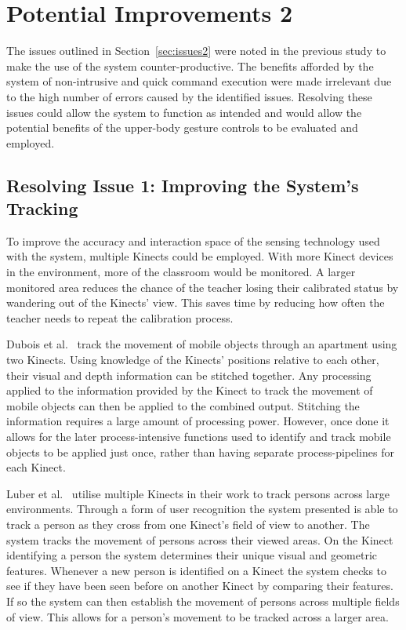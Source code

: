 \documentclass[manuscript, review, screen]{acmart}
\begin{document}
\section{Potential Improvements 2}  
\label{sec:improvements2}

The issues outlined in Section~\ref{sec:issues2} were noted in the previous study to make the use of the system counter-productive.
The benefits afforded by the system of non-intrusive and quick command execution were made irrelevant due to the high number of errors caused by the identified issues.
Resolving these issues could allow the system to function as intended and would allow the potential benefits of the upper-body gesture controls to be evaluated and employed.

\subsection{Resolving Issue 1: Improving the System's Tracking}
\label{sec:improve_accuracy}

To improve the accuracy and interaction space of the sensing technology used with the system, multiple Kinects could be employed.
With more Kinect devices in the environment, more of the classroom would be monitored.
A larger monitored area reduces the chance of the teacher losing their calibrated status by wandering out of the Kinects' view.
This saves time by reducing how often the teacher needs to repeat the calibration process.

Dubois et al.~\cite{Dubois2011} track the movement of mobile objects through an apartment using two Kinects.
Using knowledge of the Kinects' positions relative to each other, their visual and depth information can be stitched together.
Any processing applied to the information provided by the Kinect to track the movement of mobile objects can then be applied to the combined output.
Stitching the information requires a large amount of processing power.
However, once done it allows for the later process-intensive functions used to identify and track mobile objects to be applied just once, rather than having separate process-pipelines for each Kinect.

Luber et al.~\cite{Luber2011} utilise multiple Kinects in their work to track persons across large environments.
Through a form of user recognition the system presented is able to track a person as they cross from one Kinect's field of view to another.
The system tracks the movement of persons across their viewed areas.
On the Kinect identifying a person the system determines their unique visual and geometric features.
Whenever a new person is identified on a Kinect the system checks to see if they have been seen before on another Kinect by comparing their features.
If so the system can then establish the movement of persons across multiple fields of view.
This allows for a person's movement to be tracked across a larger area.
\end{document}
